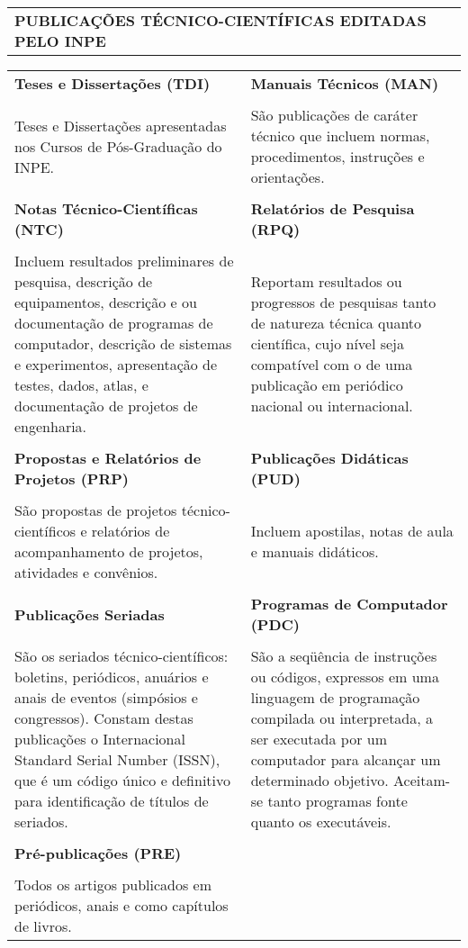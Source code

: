 \thispagestyle{empty}
\begin{table}
\begin{center}
\begin{tabularx}{\textwidth}{X}
\textbf{PUBLICAÇÕES TÉCNICO-CIENTÍFICAS EDITADAS PELO INPE}
\end{tabularx} 
\end{center}
\end{table}
  
\begin{table}
\begin{center}
\begin{tabularx}{\textwidth}{X X}   
\textbf{Teses e Dissertações (TDI)} & \textbf{Manuais Técnicos (MAN)}\\
\\
Teses e Dissertações apresentadas nos Cursos de Pós-Graduação do INPE. & São publicações de caráter técnico que incluem normas, procedimentos, instruções e orientações.\\
\\
\textbf{Notas Técnico-Científicas (NTC)} & \textbf{Relatórios de Pesquisa (RPQ)}\\
\\
Incluem resultados preliminares de pesquisa, descrição de equipamentos, descrição e ou documentação de programas de computador, descrição de sistemas e experimentos, apresentação de testes, dados, atlas, e documentação de projetos de engenharia. & Reportam resultados ou progressos de pesquisas tanto de natureza técnica quanto científica, cujo nível seja compatível com o de uma publicação em periódico nacional ou internacional.\\
\\
\textbf{Propostas e Relatórios de Projetos (PRP)} & \textbf{Publicações Didáticas (PUD)} 
\\
\\
São propostas de projetos técnico-científicos e relatórios de acompanhamento de projetos, atividades e convênios. & Incluem apostilas, notas de aula e manuais didáticos.\\
\\         
\textbf{Publicações Seriadas} & \textbf{Programas de Computador (PDC)}\\
\\
São os seriados técnico-científicos: boletins, periódicos, anuários e anais de eventos (simpósios e congressos). Constam destas publicações o Internacional Standard Serial Number (ISSN), que é um código único e definitivo para identificação de títulos de seriados. & São a seqüência de instruções ou códigos, expressos em uma linguagem de programação compilada ou interpretada, a ser executada por um computador para alcançar um determinado objetivo. Aceitam-se tanto programas fonte quanto os executáveis.\\
\\
\textbf{Pré-publicações (PRE)}\\
\\
Todos os artigos publicados em  periódicos, anais e como capítulos de livros.\\            
\end{tabularx}
\end{center}
\end{table}